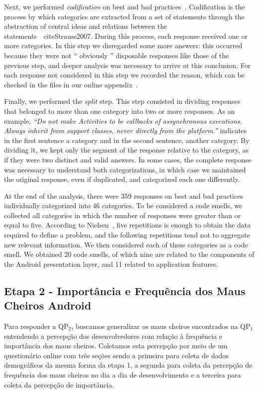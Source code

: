 Next, we performed \textit{codification} on best and bad practices~\cite{Strauss2007, Saldana2013}. Codification is the process by which categories are extracted from a set of statements through the abstraction of central ideas and relations between the statements~\ cite{Strauss2007}. During this process, each response received one or more categories. In this step we disregarded some more answers: this occurred because they were not `` obviously '' disposable responses like those of the previous step, and deeper analysis was necessary to arrive at this conclusion. For each response not considered in this step we recorded the reason, which can be checked in the files in our online appendix~\cite{apendice}.

Finally, we performed the \textit {split} step. This step consisted in dividing responses that belonged to more than one category into two or more responses.
As an example, \textit{``Do not make Activities to be callbacks of assynchronous executions. Always inherit from support classes, never directly from the platform.''} indicates in the first sentence a category and in the second sentence, another category. By dividing it, we kept only the segment of the response relative to the category, as if they were two distinct and valid answers. In some cases, the complete response was necessary to understand both categorizations, in which case we maintained the original response, even if duplicated, and categorized each one differently.

At the end of the analysis, there were 359 responses on best and bad practices individually categorized into 46 categories. 
To be considered a code smells, we collected all categories in which the number
of responses were greater than or equal to five.
According to Nielsen~\cite{NielsenMagicNumber: 00}, five repetitions is enough to obtain the data required to define a problem, and the following repetitions tend not to aggregate new relevant information. We then considered each of these categories as a code smell.
We obtained 20 code smells, of which nine are related to the components of the Android presentation layer, and 11 related to application features.

\subsection{Etapa 2 - Importância e Frequência dos Maus Cheiros Android}



Para responder a QP$_2$, buscamos generalizar os maus cheiros encontrados na QP$_1$ entendendo a percepção dos desenvolvedores com relação à frequência e importância dos maus cheiros. Coletamos esta percepção por meio de um questionário online com três seções sendo a primeira para coleta de dados demográficos da mesma forma da etapa 1, a segunda para coleta da percepção de frequência dos maus cheiros no dia a dia de desenvolvimento e a terceira para coleta da percepção de importância. 

